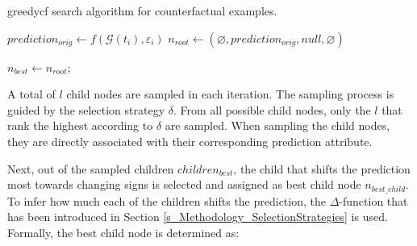 {
\setlength{\algomargin}{1.25em}
\small
\begin{algorithm}[ht]
\caption{\gls{greedycf} search algorithm for counterfactual examples.}
\label{a_GreedyCF}
    $prediction_{orig} \gets f(\mathcal{G}(t_i), \varepsilon_i)$\; \label{a_GreedyCF_pred_orig}
    $n_{root} \gets (\varnothing, prediction_{orig}, null, \varnothing)$\; \label{a_GreedyCF_root_init}

    $n_{best} \gets n_{root}$; \label{a_GreedyCF_set_root_best}

\end{algorithm}
}


A total of $l$ child nodes are sampled in each iteration. The sampling process is guided by the selection strategy $\delta$. From all possible child nodes, only the $l$ that rank the highest according to $\delta$ are sampled. When sampling the child nodes, they are directly associated with their corresponding prediction attribute. 

\newpage

Next, out of the sampled children $children_{best}$, the child that shifts the prediction most towards changing signs is selected and assigned as best child node $n_{best\_child}$. To infer how much each of the children shifts the prediction, the $\Delta$-function that has been introduced in Section \ref{s_Methodology_SelectionStrategies} is used. Formally, the best child node is determined as:

